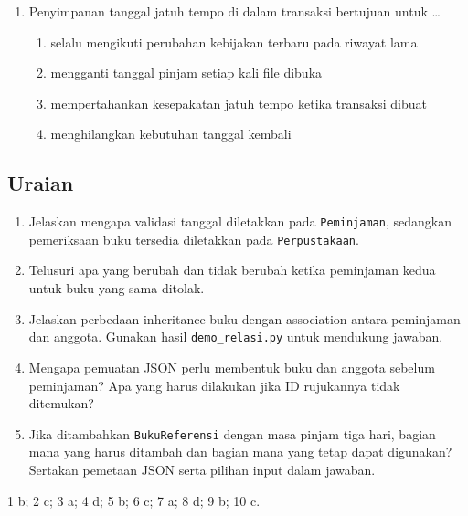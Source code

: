 \begin{enumerate}
\begin{enumerate}[label=\alph*.,itemsep=0pt]
    \item melaporkan kegagalan dan berhenti sebelum mengubah simpanan
    \item otomatis menganggap semua buku tersedia lalu menyimpan
    \item memuat hanya baris pertama tanpa pemeriksaan
  \end{enumerate}
  \item Penyimpanan tanggal jatuh tempo di dalam transaksi bertujuan untuk \ldots
  \begin{enumerate}[label=\alph*.,itemsep=0pt]
    \item selalu mengikuti perubahan kebijakan terbaru pada riwayat lama
    \item mengganti tanggal pinjam setiap kali file dibuka
    \item mempertahankan kesepakatan jatuh tempo ketika transaksi dibuat
    \item menghilangkan kebutuhan tanggal kembali
  \end{enumerate}
\end{enumerate}

\subsection{Uraian}

\begin{enumerate}
  \item Jelaskan mengapa validasi tanggal diletakkan pada \texttt{Peminjaman}, sedangkan pemeriksaan buku tersedia diletakkan pada \texttt{Perpustakaan}.
  \item Telusuri apa yang berubah dan tidak berubah ketika peminjaman kedua untuk buku yang sama ditolak.
  \item Jelaskan perbedaan inheritance buku dengan association antara peminjaman dan anggota. Gunakan hasil \texttt{demo\_relasi.py} untuk mendukung jawaban.
  \item Mengapa pemuatan JSON perlu membentuk buku dan anggota sebelum peminjaman? Apa yang harus dilakukan jika ID rujukannya tidak ditemukan?
  \item Jika ditambahkan \texttt{BukuReferensi} dengan masa pinjam tiga hari, bagian mana yang harus ditambah dan bagian mana yang tetap dapat digunakan? Sertakan pemetaan JSON serta pilihan input dalam jawaban.
\end{enumerate}

\begin{info}
1 b; 2 c; 3 a; 4 d; 5 b; 6 c; 7 a; 8 d; 9 b; 10 c.
\end{info}

